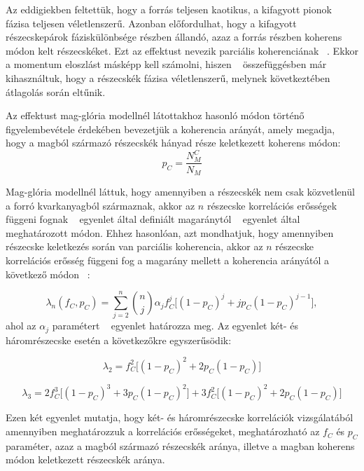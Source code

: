 \documentclass[11pt,a4paper]{article}
\numberwithin{equation}{subsection}
\numberwithin{figure}{section}
\begin{document}
Az eddigiekben feltettük, hogy a forrás teljesen kaotikus, a kifagyott pionok fázisa teljesen véletlenszerű. Azonban előfordulhat, hogy a kifagyott részecskepárok fáziskülönbsége részben állandó, azaz a forrás részben koherens módon kelt részecskéket. Ezt az effektust nevezik parciális koherenciának ~\cite{Csorgo:1998tn, Csorgo:1999sj, Csorgo:1997uf}. Ekkor a momentum eloszlást másképp kell számolni, hiszen ~ összefüggésben már kihasználtuk, hogy a részecskék fázisa véletlenszerű, melynek következtében átlagolás során eltűnik. 

Az effektust mag-glória modellnél látottakhoz hasonló módon történő figyelembevétele érdekében bevezetjük a koherencia arányát, amely megadja, hogy a magból származó részecskék hányad része keletkezett koherens módon:
\begin{equation}
p_C = \frac{N_M^C}{N_M}
\end{equation}

Mag-glória modellnél láttuk, hogy amennyiben a részecskék nem csak közvetlenül a forró kvarkanyagból származnak, akkor az $n$ részecske korrelációs erősségek függeni fognak ~ egyenlet által definiált magaránytól ~ egyenlet által meghatározott módon. Ehhez hasonlóan, azt mondhatjuk, hogy amennyiben részecske keletkezés során van parciális koherencia, akkor az $n$ részecske korrelációs erősség függeni fog a magarány mellett a koherencia arányától a következő módon ~\cite{Csorgo:1998tn, Csorgo:1997uf}:

\begin{equation}
\lambda_n(f_C, p_C) = \sum_{j=2}^{n}\binom{n}{j}\alpha_j f_C^j\big[(1-p_C)^j+jp_C(1-p_C)^{j-1}\big],
\end{equation}
ahol az $\alpha_j$ paramétert ~ egyenlet határozza meg. Az egyenlet két- és háromrészecske esetén a következőkre egyszerűsödik:

\begin{equation}
\lambda_2 =  f_C^2\big[(1-p_C)^2+2p_C(1-p_C)\big]
\end{equation}

\begin{equation}
\lambda_3 =  2f_C^3\big[(1-p_C)^3+3p_C(1-p_C)^2\big]+3f_C^2\big[(1-p_C)^2+2p_C(1-p_C)\big]
\end{equation}

Ezen két egyenlet mutatja, hogy két- és háromrészecske korrelációk vizsgálatából amennyiben meghatározzuk a korrelációs erősségeket, meghatározható az $f_C$ és $p_C$ paraméter, azaz a magból származó részecskék aránya, illetve a magban koherens módon keletkezett részecskék aránya.
\end{document}
